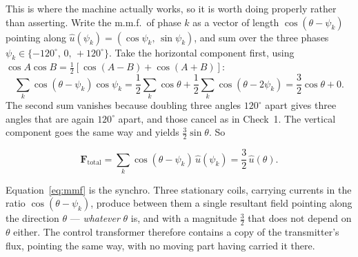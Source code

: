 \documentclass[11pt,a4paper]{article}
\begin{document}
This is where the machine actually works, so it is worth doing properly rather
than asserting. Write the m.m.f.\ of phase $k$ as a vector of length
$\cos(\theta-\psi_{k})$ pointing along $\hat{u}(\psi_{k})
=(\cos\psi_{k},\,\sin\psi_{k})$, and sum over the three phases
$\psi_{k}\in\{-120^\circ,\,0,\,+120^\circ\}$. Take the horizontal component
first, using $\cos A\cos B=\tfrac{1}{2}[\cos(A-B)+\cos(A+B)]$:
\[
  \sum_{k}\cos(\theta-\psi_{k})\cos\psi_{k}
  =\frac{1}{2}\sum_{k}\cos\theta+\frac{1}{2}\sum_{k}\cos(\theta-2\psi_{k})
  =\frac{3}{2}\cos\theta+0 .
\]
The second sum vanishes because doubling three angles $120^\circ$ apart gives
three angles that are again $120^\circ$ apart, and those cancel as in Check~1.
The vertical component goes the same way and yields $\tfrac{3}{2}\sin\theta$.
So

\begin{equation}
  \mathbf{F}_{\text{total}}
  =\sum_{k}\cos(\theta-\psi_{k})\,\hat{u}(\psi_{k})
  =\frac{3}{2}\,\hat{u}(\theta).
  \label{eq:mmf}
\end{equation}

\begin{keyidea}
Equation~\eqref{eq:mmf} is the synchro. Three stationary coils, carrying
currents in the ratio $\cos(\theta-\psi_{k})$, produce between them a single
resultant field pointing along the direction $\theta$ --- \emph{whatever}
$\theta$ is, and with a magnitude $\tfrac{3}{2}$ that does not depend on
$\theta$ either. The control transformer therefore contains a copy of the
transmitter's flux, pointing the same way, with no moving part having carried
it there.
\end{keyidea}
\end{document}
